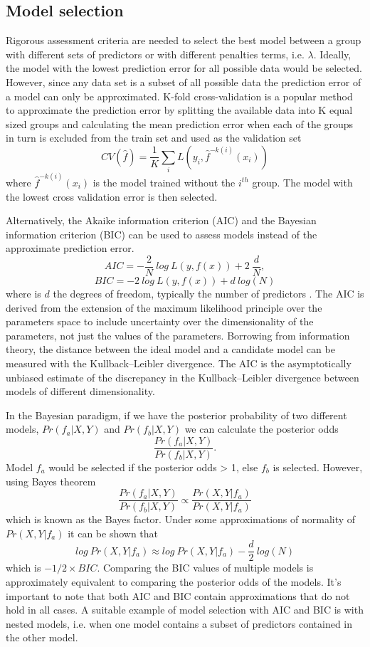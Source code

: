 \documentclass[../main.tex]{subfiles}
\begin{document}
\subsection{Model selection}

Rigorous assessment criteria are needed to select the best model between a group with different sets of predictors or with different penalties terms, i.e. $\lambda$.
Ideally, the model with the lowest prediction error for all possible data would be selected.
However, since any data set is a subset of all possible data the prediction error of a model can only be approximated.
K-fold cross-validation is a popular method to approximate the prediction error by splitting the available data into K equal sized groups and calculating the mean prediction error when each of the groups in turn is excluded from the train set and used as the validation set
$$CV(\hat{f})=\frac{1}{K}\sum_iL(y_i,\hat{f}^{-k(i)}(x_i))$$
where $\hat{f}^{-k(i)}(x_i)$ is the model trained without the $i^{th}$ group.
The model with the lowest cross validation error is then selected.

Alternatively, the Akaike information criterion (AIC) and the Bayesian information criterion (BIC) can be used to assess models instead of the approximate prediction error.
$$AIC = -\frac{2}{N}\ log\ L(y,f(x)) + 2\ \frac{d}{N},$$
$$BIC = -2\ log\ L(y,f(x))  + d\ log(N)$$
where is $d$ the degrees of freedom, typically the number of predictors \parencite{Schwarz1978,Akaike1971}.
The AIC is derived from the extension of the maximum likelihood principle over the parameters space to include uncertainty over the dimensionality of the parameters, not just the values of the parameters.
Borrowing from information theory, the distance between the ideal model and a candidate model can be measured with the Kullback–Leibler divergence.
The AIC is the asymptotically unbiased estimate of the discrepancy in the Kullback–Leibler divergence between models of different dimensionality.

In the Bayesian paradigm, if we have the posterior probability of two different models, $Pr(f_a|X,Y)$ and $Pr(f_b|X,Y)$ we can calculate the posterior odds 
$$\frac{Pr(f_a|X,Y)}{Pr(f_b|X,Y)}.$$
Model $f_a$ would be selected if the posterior odds > 1, else $f_b$ is selected. 
However, using Bayes theorem
$$\frac{Pr(f_a|X,Y)}{Pr(f_b|X,Y)} \propto \frac{Pr(X,Y|f_a)}{Pr(X,Y|f_a)}$$
which is known as the Bayes factor.
Under some approximations of normality of $Pr(X,Y|f_a)$ it can be shown that
$$log\ Pr(X,Y|f_a) \approx log\ Pr(X,Y|f_a) - \frac{d}{2}\ log(N)$$
which is $-1/2 \times BIC$. 
Comparing the BIC values of multiple models is approximately equivalent to comparing the posterior odds of the models.
It's important to note that both AIC and BIC contain approximations that do not hold in all cases.
A suitable example of model selection with AIC and BIC is with nested models, i.e. when one model contains a subset of predictors contained in the other model.
\end{document}
